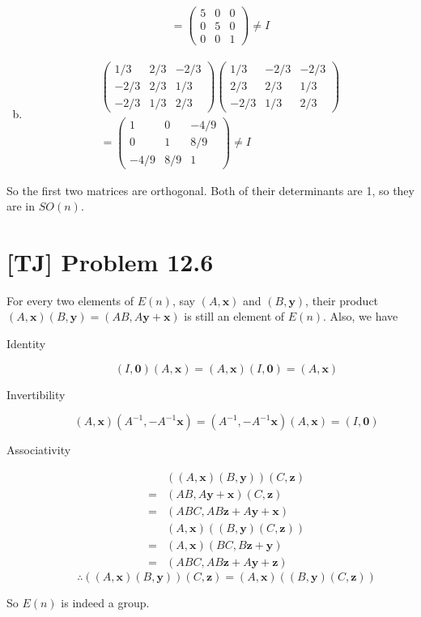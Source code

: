 \documentclass[a4paper,11pt,twocolumn]{article}
\begin{document}
\begin{enumerate}[(a)]
\begin{gather*}
    =  \begin{pmatrix} 5 & 0 & 0 \\ 0 & 5 & 0 \\ 0 & 0 & 1 \end{pmatrix} \neq I
    \end{gather*}
    \item
    \begin{gather*}
      \begin{pmatrix}
        1/3 & 2/3 & -2/3 \\
        -2/3 & 2/3 & 1/3 \\
        -2/3 & 1/3 & 2/3
      \end{pmatrix}
      \begin{pmatrix}
        1/3 & -2/3 & -2/3 \\
        2/3 & 2/3 & 1/3 \\
        -2/3 & 1/3 & 2/3
      \end{pmatrix} \\
    =  \begin{pmatrix} 1 & 0 & -4/9 \\ 0 & 1 & 8/9 \\ -4/9 & 8/9 & 1\end{pmatrix} \neq I
    \end{gather*}
  \end{enumerate}
  So the first two matrices are orthogonal. Both of their determinants are 1, so they are in $SO(n)$.

  \section{[TJ] Problem 12.6}
  For every two elements of $E(n)$, say $(A, \bm{x})$ and $(B, \bm{y})$, their product $(A, \bm{x})(B, \bm{y}) = (AB, A\bm{y}+\bm{x})$ is still an element of $E(n)$. Also, we have
  \begin{description}
    \item [Identity] $$(I, \bm{0})(A, \bm{x}) = (A, \bm{x})(I, \bm{0}) = (A, \bm{x})$$
    \item [Invertibility] $$(A, \bm{x})(A^{-1}, -A^{-1}\bm{x}) = (A^{-1}, -A^{-1}\bm{x})(A, \bm{x}) = (I, \bm{0})$$
    \item [Associativity]
    \begin{align*}
        & ((A, \bm{x})(B, \bm{y}))(C, \bm{z}) \\
      = & (AB, A\bm{y}+\bm{x})(C, \bm{z}) \\
      = & (ABC, AB\bm{z}+A\bm{y}+\bm{x}) \\
        & (A, \bm{x})((B, \bm{y})(C, \bm{z})) \\
      = & (A, \bm{x})(BC, B\bm{z} + \bm{y}) \\
      = & (ABC, AB\bm{z}+A\bm{y}+\bm{z})
    \end{align*}
    $$ \therefore ((A, \bm{x})(B, \bm{y}))(C, \bm{z}) = (A, \bm{x})((B, \bm{y})(C, \bm{z}))$$
  \end{description}
  So $E(n)$ is indeed a group.
\end{document}

